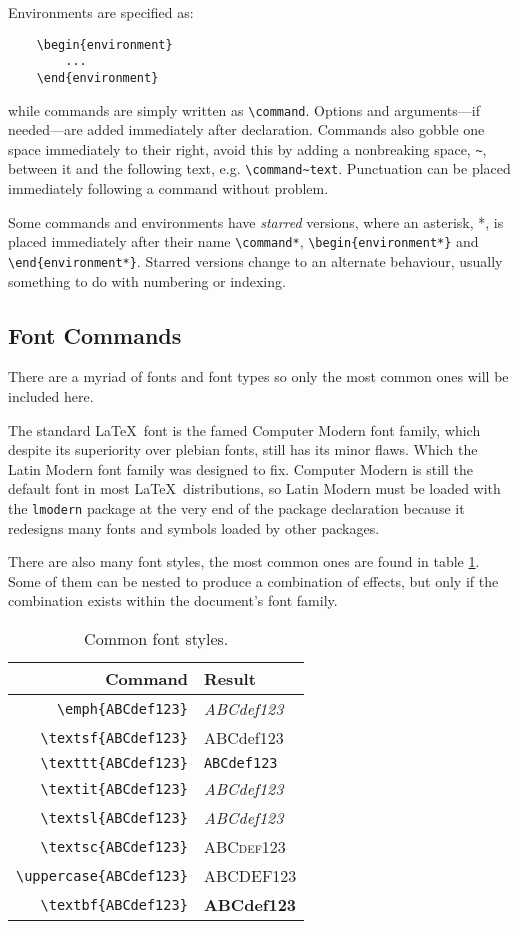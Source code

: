 Environments are specified as:
\begin{verbatim}
	\begin{environment}
	    ...
	\end{environment}
\end{verbatim}
while commands are simply written as \verb|\command|. Options and arguments---if needed---are added immediately after declaration. Commands also gobble one space immediately to their right, avoid this by adding a nonbreaking space, \verb|~|, between it and the following text, e.g. \verb|\command~text|. Punctuation can be placed immediately following a command without problem.

Some commands and environments have \emph{starred} versions, where an asterisk, *, is placed immediately after their name \verb|\command*|, \verb|\begin{environment*}| and \verb|\end{environment*}|. Starred versions change to an alternate behaviour, usually something to do with numbering or indexing.
%
\subsection{Font Commands}
%
There are a myriad of fonts and font types so only the most common ones will be included here.

The standard \LaTeX~font is the famed Computer Modern font family, which despite its superiority over plebian fonts, still has its minor flaws. Which the Latin Modern font family was designed to fix. Computer Modern is still the default font in most \LaTeX~distributions, so Latin Modern must be loaded with the \verb|lmodern| package at the very end of the package declaration because it redesigns many fonts and symbols loaded by other packages. 

There are also many font styles, the most common ones are found in table \ref{t:font}. Some of them can be nested to produce a combination of effects, but only if the combination exists within the document's font family.
\begin{table}[!htbp]
    \centering
    \caption{Common font styles.}
    \label{t:font}
    \begin{tabular}{rl}
        \toprule
        Command & Result \\
        \midrule
        \verb|\emph{ABCdef123}| & \emph{ABCdef123}  \\
        \verb|\textsf{ABCdef123}| & \textsf{ABCdef123} \\
        \verb|\texttt{ABCdef123}| & \texttt{ABCdef123} \\
        \verb|\textit{ABCdef123}| & \textit{ABCdef123} \\
        \verb|\textsl{ABCdef123}| & \textsl{ABCdef123} \\
        \verb|\textsc{ABCdef123}| & \textsc{ABCdef123}  \\
        \verb|\uppercase{ABCdef123}| & \uppercase{ABCdef123} \\
        \verb|\textbf{ABCdef123}| & \textbf{ABCdef123} \\
        \bottomrule
    \end{tabular}
\end{table}

